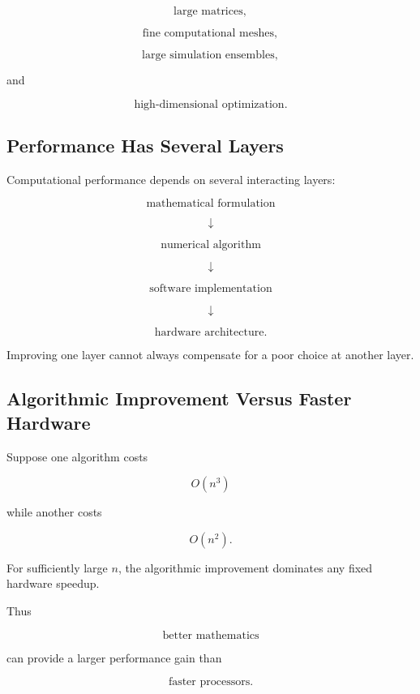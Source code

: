 \[
\boxed{
\text{large matrices},
}
\]

\[
\boxed{
\text{fine computational meshes},
}
\]

\[
\boxed{
\text{large simulation ensembles},
}
\]

and

\[
\boxed{
\text{high-dimensional optimization}.
}
\]

\subsection{Performance Has Several Layers}
\label{subsec:hpmc-performance-layers}

Computational performance depends on several interacting layers:

\[
\boxed{
\text{mathematical formulation}
}
\]

\[
\downarrow
\]

\[
\boxed{
\text{numerical algorithm}
}
\]

\[
\downarrow
\]

\[
\boxed{
\text{software implementation}
}
\]

\[
\downarrow
\]

\[
\boxed{
\text{hardware architecture}.
}
\]

Improving one layer cannot always compensate for a poor choice at another
layer.

\subsection{Algorithmic Improvement Versus Faster Hardware}
\label{subsec:algorithm-versus-hardware}

Suppose one algorithm costs

\[
O(n^3)
\]

while another costs

\[
O(n^2).
\]

For sufficiently large \(n\), the algorithmic improvement dominates any
fixed hardware speedup.

Thus

\[
\boxed{
\text{better mathematics}
}
\]

can provide a larger performance gain than

\[
\boxed{
\text{faster processors}.
}
\]

